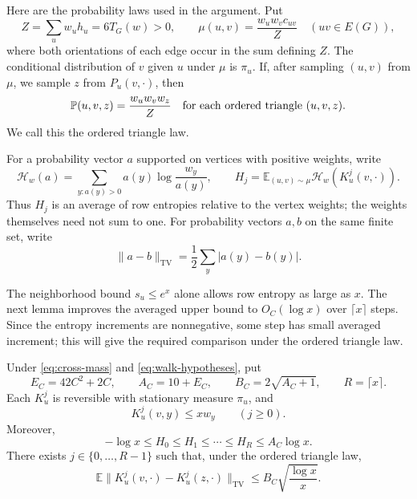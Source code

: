 Here are the probability laws used in the argument.  Put
\[
 Z=\sum_u w_uh_u=6T_G(w)>0,
 \qquad \mu(u,v)=\frac{w_uw_vc_{uv}}{Z}\quad(uv\in E(G)),
\]
where both orientations of each edge occur in the sum defining $Z$.
The conditional distribution of $v$ given $u$ under $\mu$ is $\pi_u$.
If, after sampling $(u,v)$ from $\mu$, we sample $z$ from $P_u(v,\cdot)$,
then
\begin{equation}
 \mathbb P(u,v,z)=\frac{w_uw_vw_z}{Z}
 \quad\hbox{for each ordered triangle $(u,v,z)$}.
 \label{eq:ordered-triangle-law}
\end{equation}
We call this the ordered triangle law.

For a probability vector $a$ supported on vertices with positive weights,
write
\[
 \mathcal H_w(a)=\sum_{y:a(y)>0}a(y)\log\frac{w_y}{a(y)},\qquad
 H_j=\mathbb E_{(u,v)\sim\mu}\mathcal H_w(K_u^j(v,\cdot)).
\]
Thus $H_j$ is an average of row entropies relative to the vertex weights;
the weights themselves need not sum to one.  For probability vectors $a,b$
on the same finite set, write
\[
 \|a-b\|_{\mathrm{TV}}=\frac12\sum_y|a(y)-b(y)|.
\]

The neighborhood bound $s_u\le e^x$ alone allows row entropy as large
as $x$.  The next lemma improves the averaged upper bound to
$O_C(\log x)$ over $\lceil x\rceil$ steps.  Since the entropy increments
are nonnegative, some step has small averaged increment; this will give
the required comparison under the ordered triangle law.

\begin{lemma}
\label{lem:entropy-smoothing}
Under \eqref{eq:cross-mass} and \eqref{eq:walk-hypotheses}, put
\[
 E_C=42C^2+2C,\qquad A_C=10+E_C,\qquad B_C=2\sqrt{A_C+1},
 \qquad R=\lceil x\rceil.
\]
Each $K_u^j$ is reversible with stationary measure $\pi_u$, and
\begin{equation}
 K_u^j(v,y)\le xw_y\qquad(j\ge0).
 \label{eq:walk-density}
\end{equation}
Moreover,
\begin{equation}
 -\log x\le H_0\le H_1\le\cdots\le H_R\le A_C\log x.
 \label{eq:entropy-upper}
\end{equation}
There exists $j\in\{0,\ldots,R-1\}$ such that, under the ordered triangle
law,
\begin{equation}
 \mathbb E\bigl\|K_u^j(v,\cdot)-K_u^j(z,\cdot)\bigr\|_{\mathrm{TV}}
 \le B_C\sqrt{\frac{\log x}{x}}.
 \label{eq:triangle-row-distance}
\end{equation}
\end{lemma}

